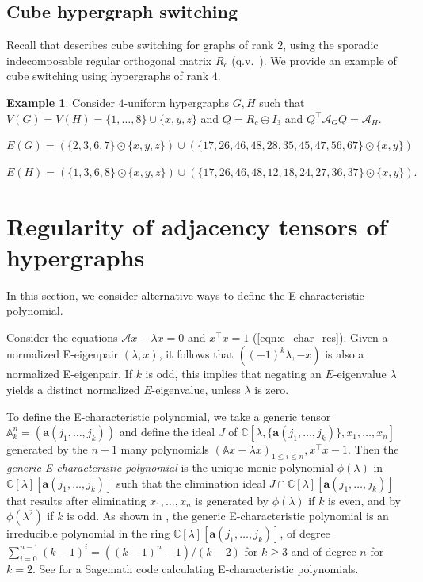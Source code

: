 \documentclass[12pt]{article}
\numberwithin{equation}{section}
\theoremstyle{definition}
\newtheorem{example}{Example}
\newcommand{\ev}[1]{( #1 )}
\newcommand{\C}{\mathbb{C}}
\begin{document}
\subsection{Cube hypergraph switching}
Recall that \cite[Theorem 31, p.~19]{abiad_berg_simoens} describes cube switching for graphs of rank $2$, using the sporadic indecomposable regular orthogonal matrix $R_{c}$ (q.v.~). We provide an example of cube switching using hypergraphs of rank $4$. 
\begin{example}
Consider $4$-uniform hypergraphs $G,H$ such that $V\ev{G} = V\ev{H} = \{ 1,\ldots, 8\} \cup \{ x, y, z\}$ and $Q = R_c \oplus I_3$ and $Q^\top \mathcal{A}_G Q = \mathcal{A}_H$.

$ E\ev{G} = (\{ 2,3,6,7 \} \odot \{ x, y, z\}) \cup (\{ 17, 26, 46, 48, 28, 35, 45, 47, 56, 67 \} \odot \{ x, y \})$

$ E\ev{H} = (\{ 1,3,6,8 \} \odot \{ x, y, z\}) \cup (\{ 17, 26, 46, 48, 12, 18, 24, 27, 36, 37 \} \odot \{ x, y \}).$ 
\end{example}



\section{Regularity of adjacency tensors of hypergraphs}\label{sec:regular_implies_complete}

In this section, we consider alternative ways to define the E-characteristic polynomial. 

Consider the equations $\mathcal{A}x-\lambda x = 0$ and $x^\top x = 1$ (\ref{eqn:e_char_res}). Given a normalized E-eigenpair $\ev{\lambda,x}$, it follows that $\ev{\ev{-1}^{k}\lambda,-x}$ is also a normalized E-eigenpair. If $k$ is odd, this implies that negating an $E$-eigenvalue $\lambda$ yields a distinct normalized $E$-eigenvalue, unless $\lambda$ is zero. 

To define the E-characteristic polynomial, we take a generic tensor $\mathbb{A}^n_k = \ev{ \mathbf{a}\ev{j_1,\ldots,j_k} }$ and define the ideal $J$ of $\C[\lambda, \{ \mathbf{a}\ev{j_1,\ldots,j_k} \}, x_1, \ldots, x_n]$ generated by the $n+1$ many polynomials $ (\mathbb{A}x - \lambda x)_{1\leq i \leq n}, x^\top x - 1$. Then the \textit{generic E-characteristic polynomial} is the unique monic polynomial $\phi\ev{\lambda}$ in $\C[\lambda][\mathbf{a}\ev{j_1,\ldots,j_k}]$ such that the elimination ideal $J \cap \C[\lambda][\mathbf{a}\ev{j_1,\ldots,j_k}]$ that results after eliminating $x_1,\ldots,x_n$ is generated by $\phi\ev{\lambda}$ if $k$ is even, and by $\phi\ev{\lambda^2}$ if $k$ is odd. As shown in \cite[Corollary 3.1, p.~946]{CARTWRIGHT2013942}, the generic E-characteristic polynomial is an irreducible polynomial in the ring $\C[\lambda][\mathbf{a}\ev{j_1,\ldots,j_k}]$, of degree $\sum_{i=0}^{n-1}\ev{k-1}^{i} = (\ev{k-1}^{n}-1)/(k-2)$ for $k\geq 3$ and of degree $n$ for $k=2$. See \cite{github} for a Sagemath code calculating E-characteristic polynomials. 
\end{document}

